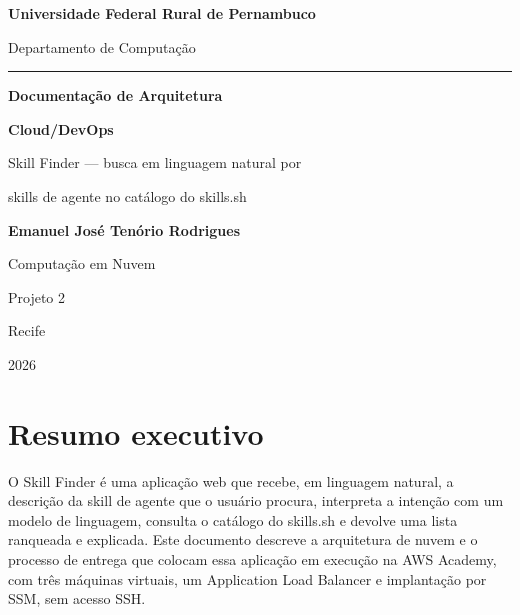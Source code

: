 \documentclass[11pt,a4paper]{article}
\begin{document}
\thispagestyle{empty}
\begin{center}
  \vspace*{1.9cm}

  {\large\bfseries Universidade Federal Rural de Pernambuco\par}
  {\normalsize Departamento de Computação\par}
  \vspace{0.3cm}
  \rule{\textwidth}{0.4pt}
  \vspace{1.5cm}

  {\Large\bfseries Documentação de Arquitetura\par}
  \vspace{0.35cm}
  {\Large\bfseries Cloud/DevOps\par}
  \vspace{0.9cm}
  {\large Skill Finder --- busca em linguagem natural por\par}
  {\large skills de agente no catálogo do skills.sh\par}

  \vspace{2.3cm}
  {\normalsize\bfseries Emanuel José Tenório Rodrigues\par}
  \vspace{0.5cm}
  {\normalsize Computação em Nuvem\par}
  {\normalsize Projeto 2\par}

  \vspace{2.6cm}
  {\normalsize Recife\par}
  {\normalsize 2026\par}
\end{center}
\clearpage

\thispagestyle{plain}
\section*{Resumo executivo}

O Skill Finder é uma aplicação web que recebe, em linguagem natural, a descrição da skill de
agente que o usuário procura, interpreta a intenção com um modelo de linguagem, consulta o catálogo
do skills.sh e devolve uma lista ranqueada e explicada. Este documento descreve a arquitetura de
nuvem e o processo de entrega que colocam essa aplicação em execução na AWS Academy, com três
máquinas virtuais, um Application Load Balancer e implantação por SSM, sem acesso SSH.
\end{document}
